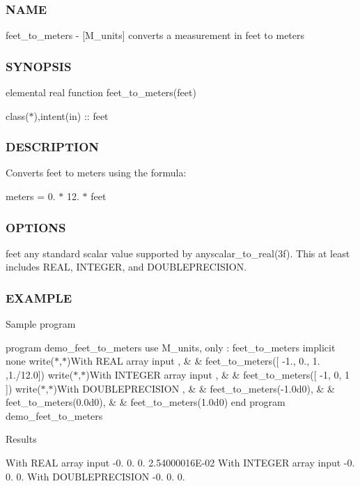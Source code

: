 \subsubsection*{N\+A\+ME}

feet\+\_\+to\+\_\+meters -\/ \mbox{[}M\+\_\+units\mbox{]} converts a measurement in feet to meters \subsubsection*{S\+Y\+N\+O\+P\+S\+IS}

elemental real function feet\+\_\+to\+\_\+meters(feet)

class($\ast$),intent(in) \+:\+: feet \subsubsection*{D\+E\+S\+C\+R\+I\+P\+T\+I\+ON}

Converts feet to meters using the formula\+:

meters = 0. $\ast$ 12. $\ast$ feet \subsubsection*{O\+P\+T\+I\+O\+NS}

feet any standard scalar value supported by anyscalar\+\_\+to\+\_\+real(3f). This at least includes R\+E\+AL, I\+N\+T\+E\+G\+ER, and D\+O\+U\+B\+L\+E\+P\+R\+E\+C\+I\+S\+I\+ON. \subsubsection*{E\+X\+A\+M\+P\+LE}

Sample program

program demo\+\_\+feet\+\_\+to\+\_\+meters use M\+\_\+units, only \+: feet\+\_\+to\+\_\+meters implicit none write($\ast$,$\ast$)\textquotesingle{}With R\+E\+AL array input \textquotesingle{}, \& \& feet\+\_\+to\+\_\+meters(\mbox{[} -\/1., 0., 1. ,1./12.0\mbox{]}) write($\ast$,$\ast$)\textquotesingle{}With I\+N\+T\+E\+G\+ER array input \textquotesingle{}, \& \& feet\+\_\+to\+\_\+meters(\mbox{[} -\/1, 0, 1 \mbox{]}) write($\ast$,$\ast$)\textquotesingle{}With D\+O\+U\+B\+L\+E\+P\+R\+E\+C\+I\+S\+I\+ON \textquotesingle{}, \& \& feet\+\_\+to\+\_\+meters(-\/1.\+0d0), \& \& feet\+\_\+to\+\_\+meters(0.\+0d0), \& \& feet\+\_\+to\+\_\+meters(1.\+0d0) end program demo\+\_\+feet\+\_\+to\+\_\+meters

Results

With R\+E\+AL array input -\/0. 0. 0. 2.\+54000016E-\/02 With I\+N\+T\+E\+G\+ER array input -\/0. 0. 0. With D\+O\+U\+B\+L\+E\+P\+R\+E\+C\+I\+S\+I\+ON -\/0. 0. 0. 

